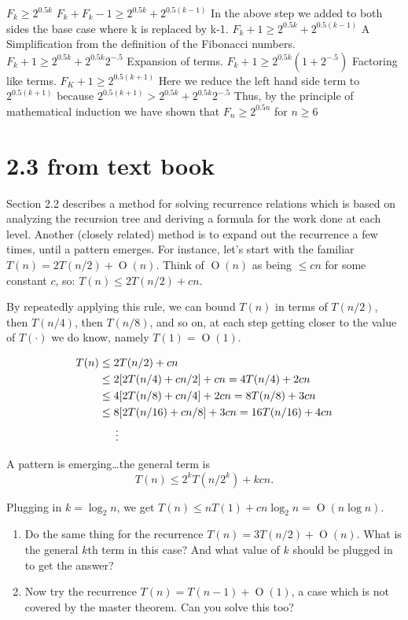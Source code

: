 \documentclass[12pt]{article}
\newcommand{\BigO}[1]{\ensuremath{\operatorname{O}\left(#1\right)}}
\begin{document}
	$F_k \geq 2^{0.5k}$
	$F_k + F_k-1 \geq 2^{0.5k} + 2^{0.5(k-1)}$
		In the above step we added to both sides the base case where k is replaced by k-1.
	$F_k+1 \geq 2^{0.5k} + 2^{0.5(k-1)}$
		A Simplification from the definition of the Fibonacci numbers.
	$F_k+1 \geq 2^{0.5k} + 2^{0.5k}2^{-.5}$
		Expansion of terms.
	$F_k+1 \geq 2^{0.5k}(1 + 2^{-.5})$
		Factoring like terms.
	$F_K+1 \geq 2^{0.5(k+1)}$
		Here we reduce the left hand side term to $2^{0.5(k+1)}$ because $2^{0.5(k+1)} > 2^{0.5k}+2^{0.5k}2^{-.5}$ 
	Thus, by the principle of mathematical induction we have shown that $F_n \geq 2^{0.5n}$ for $n \geq 6$ 
	
	
\section*{2.3 from text book}
Section 2.2 describes a method for solving recurrence relations which is
based on analyzing the recursion tree and deriving a formula for the
work done at each level.  Another (closely related) method is to expand
out the recurrence a few times, until a pattern emerges. For instance,
let’s start with the familiar $T(n) = 2T(n/2) + \BigO{n}$. Think of
$\BigO{n}$ as being $\leq cn$ for some constant $c$,
so: $T(n) \leq 2T(n/2) + cn$. 

By repeatedly applying this rule, we can bound $T(n)$ in terms of $T(n/2)$,
then $T(n/4)$, then $T(n/8)$, and so on, at each step getting closer to
the value of $T(\cdot)$ we do know,
namely $T(1) = \BigO{1}$.

\begin{align*}
T (n) &\leq 2T (n/2) + cn \\
&\leq 2[2T(n/4) + cn/2] + cn = 4T(n/4) + 2cn \\
&\leq 4[2T(n/8) + cn/4] + 2cn = 8T(n/8) + 3cn \\
&\leq 8[2T(n/16) + cn/8] + 3cn = 16T(n/16) + 4cn \\
&\indent \vdots
\end{align*}

A pattern is emerging\ldots the general term is 
\[T(n) \leq 2^kT(n/2^k) + kcn.\]

Plugging in $k = \log_2{n}$, we get $T(n) \leq nT(1) + cn\log_2{n} = \BigO{n\log{n}}.$
\begin{enumerate}
\item Do the same thing for the recurrence $T(n) = 3T(n/2) + \BigO{n}$. What
is the general $k$th term
in this case? And what value of $k$ should be plugged in to get the
answer?

\item Now try the recurrence $T(n) = T( n −1 ) + \BigO{1}$, a case which is not
covered by the master theorem. Can you solve this too?
\end{enumerate}
\end{document}
